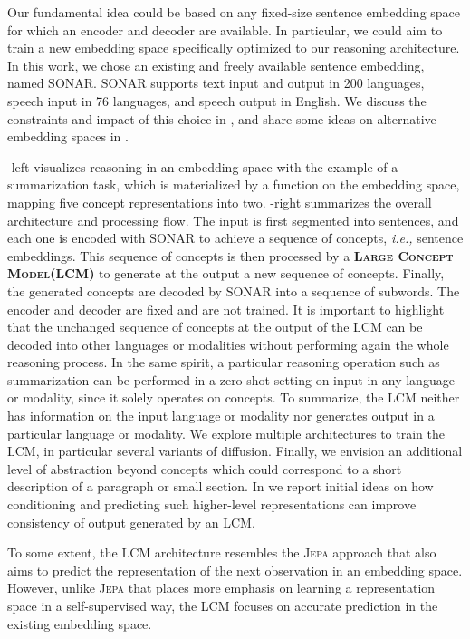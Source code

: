 \documentclass[twoside,11pt]{fairmeta}
\newcommand{\jepa}{\textsc{Jepa}\xspace}
\newcommand{\sonar}{\textsc{SONAR}\xspace}
\newcommand{\sonarLangsSpeech}{\textsc{76}\xspace}
\newcommand{\lcm}{\textsc{LCM}\xspace}
\newcommand{\LCM}{\textsc{Large Concept Model}\xspace}
\newcommand{\ie}{\textit{i.e.,}\xspace}
\begin{document}
Our fundamental idea could be based on any fixed-size sentence embedding space for which an encoder and decoder are available. In particular, we could aim to train a new embedding space specifically optimized to our reasoning architecture. In this work, we chose an existing and freely available sentence embedding, named \sonar \citep{Duquenne:2023:sonar_arxiv}. \sonar supports text input and output in 200 languages, speech input in \sonarLangsSpeech languages, and speech output in English. We discuss the constraints and impact of this choice in , and share some ideas on alternative embedding spaces in .

-left visualizes reasoning in an embedding space with the example of a summarization task, which is materialized by a function on the embedding space, mapping five concept representations into two.
-right summarizes the overall architecture and processing flow. The input is first segmented into sentences, and each one is encoded with \sonar to achieve a sequence of concepts, \ie sentence embeddings.
This sequence of concepts is then processed by a \textbf{\LCM (\lcm)} to generate at the output a new sequence of concepts. Finally, the generated concepts are decoded by \sonar into a sequence of subwords. The encoder and decoder are fixed and are not trained. It is important to highlight that the unchanged sequence of concepts at the output of the \lcm  can be decoded into other languages or modalities without performing again the whole reasoning process. In the same spirit, a particular reasoning operation such as summarization can be performed in a zero-shot setting on input in any language or modality, since it solely operates on concepts. To summarize, the \lcm neither has information on the input language or modality nor generates output in a particular language or modality.
We explore multiple architectures to train the \lcm, in particular several variants of diffusion.
Finally, we envision an additional level of abstraction beyond concepts which could correspond to a short description of a paragraph or small section. In  we report initial ideas on how conditioning and predicting such higher-level representations can improve consistency of output generated by an \lcm.

To some extent, the \lcm architecture resembles the \jepa approach \citep{jepa:openreview:2022} that also aims to predict the representation of the next observation in an embedding space. However, unlike \jepa that places more emphasis on learning a representation space in a self-supervised way, the \lcm focuses on accurate prediction in the existing embedding space.
\end{document}
